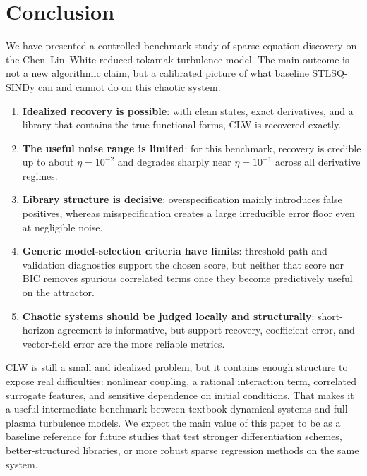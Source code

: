 \documentclass[12pt]{article}
\begin{document}
\section{Conclusion}
\label{sec:conclusion}

We have presented a controlled benchmark study of sparse equation discovery on the Chen--Lin--White reduced tokamak turbulence model.
The main outcome is not a new algorithmic claim, but a calibrated picture of what baseline STLSQ-SINDy can and cannot do on this chaotic system.

\begin{enumerate}
\item \textbf{Idealized recovery is possible}: with clean states, exact derivatives, and a library that contains the true functional forms, CLW is recovered exactly.

\item \textbf{The useful noise range is limited}: for this benchmark, recovery is credible up to about $\eta = 10^{-2}$ and degrades sharply near $\eta = 10^{-1}$ across all derivative regimes.

\item \textbf{Library structure is decisive}: overspecification mainly introduces false positives, whereas misspecification creates a large irreducible error floor even at negligible noise.

\item \textbf{Generic model-selection criteria have limits}: threshold-path and validation diagnostics support the chosen score, but neither that score nor BIC removes spurious correlated terms once they become predictively useful on the attractor.

\item \textbf{Chaotic systems should be judged locally and structurally}: short-horizon agreement is informative, but support recovery, coefficient error, and vector-field error are the more reliable metrics.
\end{enumerate}

CLW is still a small and idealized problem, but it contains enough structure to expose real difficulties: nonlinear coupling, a rational interaction term, correlated surrogate features, and sensitive dependence on initial conditions.
That makes it a useful intermediate benchmark between textbook dynamical systems and full plasma turbulence models.
We expect the main value of this paper to be as a baseline reference for future studies that test stronger differentiation schemes, better-structured libraries, or more robust sparse regression methods on the same system.
\end{document}
